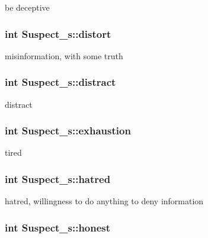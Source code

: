 be deceptive 

\hypertarget{struct_suspect__s_aa3f819eebfe94a0a230be569ddab0d52}{
\subsubsection[{distort}]{\setlength{\rightskip}{0pt plus 5cm}int Suspect\+\_\+s\+::distort}}\label{struct_suspect__s_aa3f819eebfe94a0a230be569ddab0d52}


misinformation, with some truth 

\hypertarget{struct_suspect__s_a2d2d292796fa66c5fa553cb55beb8131}{
\subsubsection[{distract}]{\setlength{\rightskip}{0pt plus 5cm}int Suspect\+\_\+s\+::distract}}\label{struct_suspect__s_a2d2d292796fa66c5fa553cb55beb8131}


distract 

\hypertarget{struct_suspect__s_a138b9d4dc4a3dc4f897ea2986fdc337a}{
\subsubsection[{exhaustion}]{\setlength{\rightskip}{0pt plus 5cm}int Suspect\+\_\+s\+::exhaustion}}\label{struct_suspect__s_a138b9d4dc4a3dc4f897ea2986fdc337a}


tired 

\hypertarget{struct_suspect__s_aaf6a1c91ce381e01b2bee299bec337dc}{
\subsubsection[{hatred}]{\setlength{\rightskip}{0pt plus 5cm}int Suspect\+\_\+s\+::hatred}}\label{struct_suspect__s_aaf6a1c91ce381e01b2bee299bec337dc}


hatred, willingness to do anything to deny information 

\hypertarget{struct_suspect__s_a20774be3bfbe97a7ff6de44ebf7c324d}{
\subsubsection[{honest}]{\setlength{\rightskip}{0pt plus 5cm}int Suspect\+\_\+s\+::honest}}\label{struct_suspect__s_a20774be3bfbe97a7ff6de44ebf7c324d}



